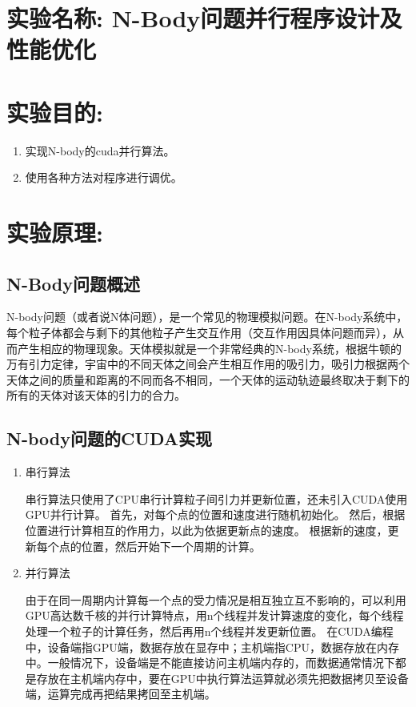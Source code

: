 \documentclass[a4paper,11pt,UTF8]{ctexart}
\begin{document}
\section{实验名称: N-Body问题并行程序设计及性能优化}
\section{实验目的:}
\begin{enumerate}
  \item 实现N-body的cuda并行算法。
  \item 使用各种方法对程序进行调优。
\end{enumerate}

\section{实验原理:}

\subsection{N-Body问题概述}

N-body问题（或者说N体问题），是一个常见的物理模拟问题。在N-body系统中，每个粒子体都会与剩下的其他粒子产生交互作用（交互作用因具体问题而异），从而产生相应的物理现象。天体模拟就是一个非常经典的N-body系统，根据牛顿的万有引力定律，宇宙中的不同天体之间会产生相互作用的吸引力，吸引力根据两个天体之间的质量和距离的不同而各不相同，一个天体的运动轨迹最终取决于剩下的所有的天体对该天体的引力的合力。

\subsection{N-body问题的CUDA实现}

\begin{enumerate}
  \item 串行算法
  
  串行算法只使用了CPU串行计算粒子间引力并更新位置，还未引入CUDA使用GPU并行计算。
首先，对每个点的位置和速度进行随机初始化。
然后，根据位置进行计算相互的作用力，以此为依据更新点的速度。
根据新的速度，更新每个点的位置，然后开始下一个周期的计算。

  \item 并行算法
  
  由于在同一周期内计算每一个点的受力情况是相互独立互不影响的，可以利用GPU高达数千核的并行计算特点，用n个线程并发计算速度的变化，每个线程处理一个粒子的计算任务，然后再用n个线程并发更新位置。
在CUDA编程中，设备端指GPU端，数据存放在显存中；主机端指CPU，数据存放在内存中。一般情况下，设备端是不能直接访问主机端内存的，而数据通常情况下都是存放在主机端内存中，要在GPU中执行算法运算就必须先把数据拷贝至设备端，运算完成再把结果拷回至主机端。

\end{enumerate}
\end{document}
